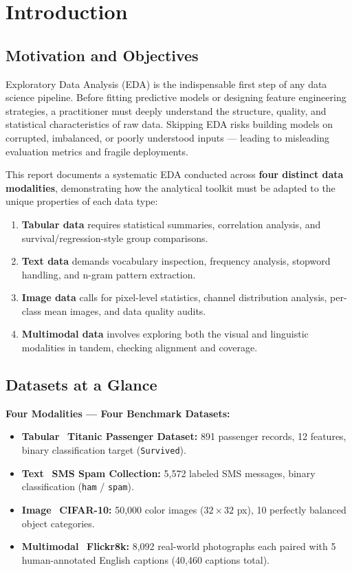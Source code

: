 \section{Introduction}
\label{sec:intro}

\subsection{Motivation and Objectives}
Exploratory Data Analysis (EDA) is the indispensable first step of any data science pipeline. Before fitting predictive models or designing feature engineering strategies, a practitioner must deeply understand the structure, quality, and statistical characteristics of raw data. Skipping EDA risks building models on corrupted, imbalanced, or poorly understood inputs — leading to misleading evaluation metrics and fragile deployments.

This report documents a systematic EDA conducted across \textbf{four distinct data modalities}, demonstrating how the analytical toolkit must be adapted to the unique properties of each data type:

\begin{enumerate}
    \item \textbf{Tabular data} requires statistical summaries, correlation analysis, and survival/regression-style group comparisons.
    \item \textbf{Text data} demands vocabulary inspection, frequency analysis, stopword handling, and n-gram pattern extraction.
    \item \textbf{Image data} calls for pixel-level statistics, channel distribution analysis, per-class mean images, and data quality audits.
    \item \textbf{Multimodal data} involves exploring both the visual and linguistic modalities in tandem, checking alignment and coverage.
\end{enumerate}

\subsection{Datasets at a Glance}

\begin{importantbox}
\textbf{Four Modalities — Four Benchmark Datasets:}
\begin{itemize}
    \item \textbf{Tabular} \textrightarrow\ \textbf{Titanic Passenger Dataset:} 891 passenger records, 12 features, binary classification target (\texttt{Survived}).
    \item \textbf{Text} \textrightarrow\ \textbf{SMS Spam Collection:} 5{,}572 labeled SMS messages, binary classification (\texttt{ham} / \texttt{spam}).
    \item \textbf{Image} \textrightarrow\ \textbf{CIFAR-10:} 50{,}000 color images ($32{\times}32$ px), 10 perfectly balanced object categories.
    \item \textbf{Multimodal} \textrightarrow\ \textbf{Flickr8k:} 8{,}092 real-world photographs each paired with 5 human-annotated English captions (40{,}460 captions total).
\end{itemize}
\end{importantbox}

